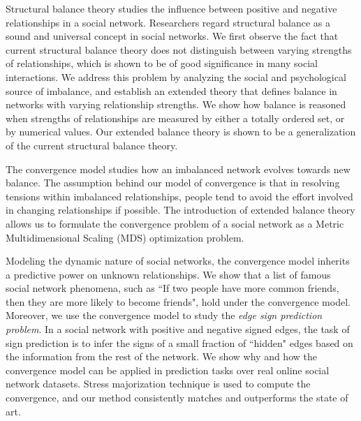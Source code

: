  

Structural balance theory studies the influence between positive and negative relationships in a social network. Researchers regard structural balance as a sound and universal concept in social networks. We first observe the fact that current structural balance theory does not distinguish between varying strengths of relationships, which is shown to be of good significance in many social interactions. We address this problem by analyzing the social and psychological source of imbalance, and establish an extended theory that defines balance in networks with varying relationship strengths.  We show how balance is reasoned when strengths of relationships are measured by either a totally ordered set, or by numerical values. Our extended balance theory is shown to be a generalization of the current structural balance theory.

The convergence model studies how an imbalanced network evolves towards new balance. The assumption behind our model of convergence is that in resolving tensions within imbalanced relationships, people tend to avoid the effort involved in changing relationships if possible. The introduction of extended balance theory allows us to formulate the convergence problem of a social network as a Metric Multidimensional Scaling (MDS) optimization problem. 

Modeling the dynamic nature of social networks, the convergence model inherits a predictive power on unknown relationships. We show that a list of famous social network phenomena, such as ``If two people have more common friends, then they are more likely to become friends", hold under the convergence model. Moreover, we use the convergence model to study the {\it edge sign prediction problem}. In a social network with positive and negative signed edges, the task of sign prediction is to infer the signs of a small fraction of ``hidden" edges based on the information from the rest of the network. We show why and how the convergence model can be applied in prediction tasks over real online social network datasets. Stress majorization technique is used to compute the convergence, and our method consistently matches and outperforms the state of art.